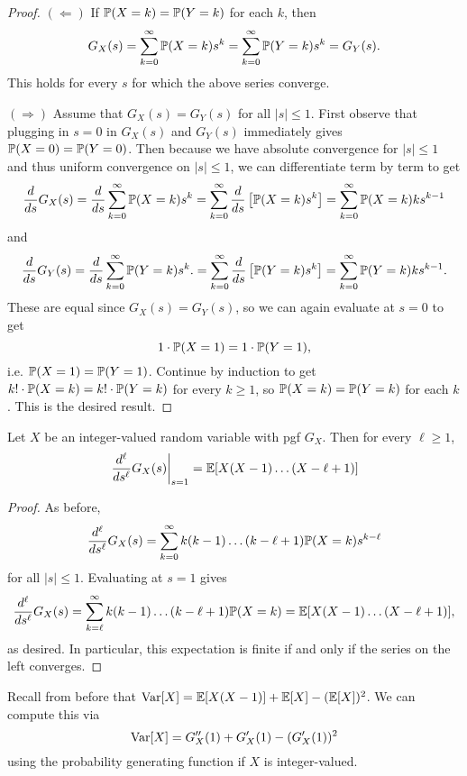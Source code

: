 \begin{proof}
  $(\Leftarrow)$ If $\mathbb{P}(X = k) = \mathbb{P}(Y = k)$ for
  each $k$, then
  \[
    G_X(s)
    = \sum_{k = 0}^\infty \mathbb{P}(X = k) s^k
    = \sum_{k = 0}^\infty \mathbb{P}(Y = k) s^k
    = G_Y(s).
  \]
  This holds for every $s$ for which the above series
  converge.

  $(\Rightarrow)$ Assume that
  $G_X(s) = G_Y(s)$ for all
  $|s| \le 1$. First observe that
  plugging in $s = 0$ in $G_X(s)$
  and $G_Y(s)$ immediately
  gives $\mathbb{P}(X = 0) = \mathbb{P}(Y = 0)$. Then
  because we have absolute convergence
  for $|s| \le 1$ and thus uniform convergence
  on $|s| \le 1$, we can differentiate
  term by term to get
  \[
    \frac{d}{ds} G_X(s)
    = \frac{d}{ds} \sum_{k = 0}^\infty \mathbb{P}(X = k) s^k
    = \sum_{k = 0}^\infty \frac{d}{ds} \left[\mathbb{P}(X = k) s^k\right]
    = \sum_{k = 0}^\infty \mathbb{P}(X = k) k s^{k - 1}
  \]
  and
  \[
    \frac{d}{ds} G_Y(s)
    = \frac{d}{ds} \sum_{k = 0}^\infty \mathbb{P}(Y = k) s^k.
    = \sum_{k = 0}^\infty \frac{d}{ds} \left[\mathbb{P}(Y = k) s^k\right]
    = \sum_{k = 0}^\infty \mathbb{P}(Y = k) k s^{k - 1}.
  \]
  These are equal since $G_X(s) = G_Y(s)$, so
  we can again evaluate at $s = 0$ to get
  \[
    1 \cdot \mathbb{P}(X = 1) = 1 \cdot \mathbb{P}(Y = 1),
  \]
  i.e. $\mathbb{P}(X = 1) = \mathbb{P}(Y = 1)$. Continue
  by induction to get $k! \cdot \mathbb{P}(X = k) = k! \cdot \mathbb{P}(Y = k)$
  for every $k \ge 1$, so $\mathbb{P}(X = k) = \mathbb{P}(Y = k)$
  for each $k$. This is the desired result.
\end{proof}

\begin{theorem}
  Let $X$ be an integer-valued random variable
  with pgf $G_X$. Then for every
  $\ell \ge 1$,
  \[
    \left.\frac{d^\ell}{ds^\ell} G_X(s)\right|_{s = 1}
      = \mathbb{E}[X(X - 1) \dots (X - \ell + 1)]
  \]
\end{theorem}

\begin{proof}
  As before,
  \[
    \frac{d^\ell}{ds^\ell} G_X(s)
    = \sum_{k = 0}^\infty k(k - 1) \dots (k - \ell + 1)
    \mathbb{P}(X = k) s^{k - \ell}
  \]
  for all $|s| \le 1$. Evaluating at $s = 1$ gives
  \[
    \frac{d^\ell}{ds^\ell} G_X(s)
    = \sum_{k = \ell}^\infty k(k - 1) \dots (k - \ell + 1) \mathbb{P}(X = k)
    = \mathbb{E}[X(X - 1) \dots (X - \ell + 1)],
  \]
  as desired. In particular, this expectation
  is finite if and only if the series on the
  left converges.
\end{proof}

\begin{remark}
  Recall from before that
  $\operatorname{Var}[X] = \mathbb{E}[X(X - 1)] + \mathbb{E}[X] - (\mathbb{E}[X])^2$.
  We can compute this via
  \[
    \operatorname{Var}[X] = G_X''(1) + G_X'(1) - (G_X'(1))^2
  \]
  using the probability generating function if
  $X$ is integer-valued.
\end{remark}

